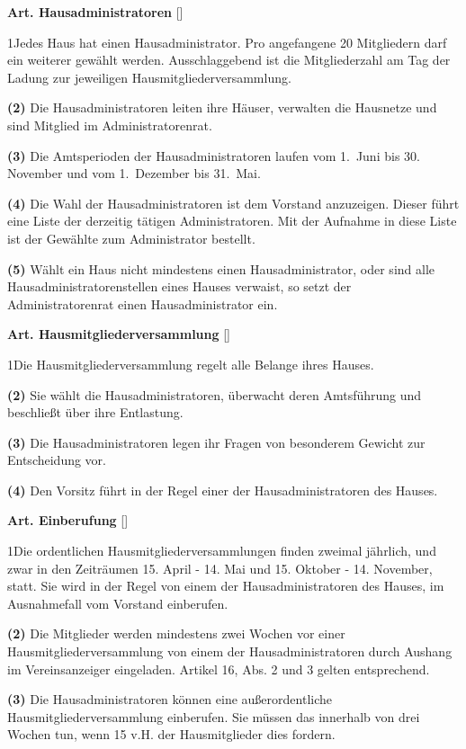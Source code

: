 \documentclass[12pt]{article}
\newcommand{\Satz}[2]{

\begin{samepage}
{\bf (#1)} #2
\end{samepage}
}
\newenvironment{Artikel}[2]{
\bigskip \centerline{{\bf Art. #1} [#2]}
\nopagebreak
}{
}
\begin{document}
\begin{Artikel}{19}{Hausadministratoren}

\Satz{1}{Jedes Haus hat einen Hausadministrator. Pro angefangene 20 Mitgliedern
darf ein weiterer gewählt werden. Ausschlaggebend ist die Mitgliederzahl am
Tag der Ladung zur jeweiligen Hausmitgliederversammlung.}

\Satz{2}{Die Hausadministratoren leiten ihre Häuser, verwalten die Hausnetze
und sind Mitglied im Administratorenrat.}

\Satz{3}{Die Amtsperioden der Hausadministratoren laufen vom \mbox{1. Juni} bis
30. November und vom \mbox{1. Dezember} bis \mbox{31. Mai}.}

\Satz{4}{Die Wahl der Hausadministratoren ist dem Vorstand anzuzeigen.  Dieser
führt eine Liste der derzeitig tätigen Administratoren. Mit der Aufnahme in
diese Liste ist der Gewählte zum Administrator bestellt.}

\Satz{5}{Wählt ein Haus nicht mindestens einen Hausadministrator, oder sind
alle Hausadministratorenstellen eines Hauses verwaist, so setzt der
Administratorenrat einen Hausadministrator ein.}

\end{Artikel}

\begin{Artikel}{20}{Hausmitgliederversammlung}

\Satz{1}{Die Hausmitgliederversammlung regelt alle Belange ihres Hauses.}

\Satz{2}{Sie wählt die Hausadministratoren, überwacht deren Amtsführung und
beschließt über ihre Entlastung.}

\Satz{3}{Die Hausadministratoren legen ihr Fragen von besonderem Gewicht zur
Entscheidung vor.}

\Satz{4}{Den Vorsitz führt in der Regel einer der Hausadministratoren des
Hauses.}

\end{Artikel}

\begin{Artikel}{21}{Einberufung}

\Satz{1}{Die ordentlichen Hausmitgliederversammlungen finden zweimal jährlich,
und zwar in den Zeit\-räumen 15. April - 14. Mai und 15. Oktober - 14. November, statt. Sie
wird in der Regel von einem der Hausadministratoren des Hauses, im Ausnahmefall
vom Vorstand einberufen.}

\Satz{2}{Die Mitglieder werden mindestens zwei Wochen vor einer
Hausmitgliederversammlung von einem der Hausadministratoren durch Aushang im
Vereinsanzeiger eingeladen. Artikel 16, Abs. 2 und 3 gelten entsprechend.}

\Satz{3}{Die Hausadministratoren können eine außerordentliche
Hausmitgliederversammlung einberufen. Sie müssen das innerhalb von drei Wochen
tun, wenn 15 v.H. der Hausmitglieder dies fordern.}

\end{Artikel}
\end{document}
